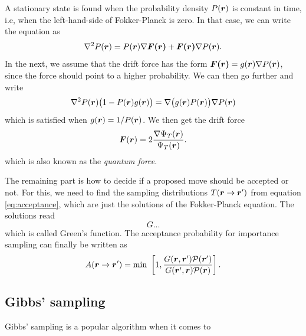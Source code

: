 A stationary state is found when the probability density $P(\boldsymbol{{r}})$ is constant in time, i.e, when the left-hand-side of Fokker-Planck is zero. In that case, we can write the equation as
\begin{equation}
\nabla^2P(\boldsymbol{{r}})=P(\boldsymbol{{r}})\nabla\boldsymbol{{F(\boldsymbol{{r}})}}+\boldsymbol{{F(\boldsymbol{{r}})}}\nabla P(\boldsymbol{{r}}).
\end{equation}
In the next, we assume that the drift force has the form $\boldsymbol{{F(\boldsymbol{{r}})}}=g(\boldsymbol{{r}})\nabla P(\boldsymbol{{r}})$, since the force should point to a higher probability. We can then go further and write
\begin{equation}
\nabla^2 P(\boldsymbol{{r}})\big(1-P(\boldsymbol{{r}})g(\boldsymbol{{r}})\big)=\nabla\big(g(\boldsymbol{{r}})P(\boldsymbol{{r}})\big)\nabla P(\boldsymbol{{r}})
\end{equation}
which is satisfied when $g(\boldsymbol{{r}})=1/P(\boldsymbol{{r}})$. We then get the drift force 
\begin{equation}
\boldsymbol{{F}}(\boldsymbol{{r}})=2\frac{\nabla\Psi_T(\boldsymbol{{r}})}{\Psi_T(\boldsymbol{{r}})}.
\end{equation}
which is also known as the \textit{quantum force}.

The remaining part is how to decide if a proposed move should be accepted or not. For this, we need to find the sampling distributions $T(\boldsymbol{{r}}\rightarrow\boldsymbol{{r}}')$ from equation \eqref{eq:acceptance}, which are just the solutions of the Fokker-Planck equation. The solutions read
\begin{equation}
G...
\end{equation}
which is called Green's function. The acceptance probability for importance sampling can finally be written as
\begin{equation}
A(\boldsymbol{{r}}\rightarrow\boldsymbol{{r}}')=\text{min }\left[1,\frac{G(\boldsymbol{{r}},\boldsymbol{{r}}')\mathcal{P}(\boldsymbol{{r}}')}{G(\boldsymbol{{r}}',\boldsymbol{{r}})\mathcal{P}(\boldsymbol{{r}})}\right].
\end{equation}

\subsection{Gibbs' sampling}
Gibbs' sampling is a popular algorithm when it comes to 